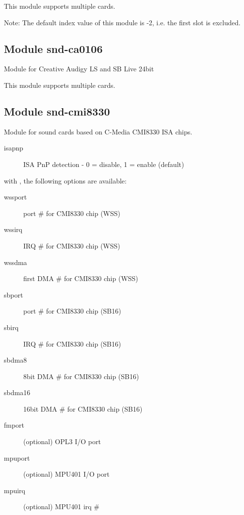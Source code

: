 \documentclass[a4paper,8pt,english]{sphinxmanual}
\begin{document}
This module supports multiple cards.

Note: The default index value of this module is -2, i.e. the first
slot is excluded.


\subsection{Module snd-ca0106}
\label{sound/alsa-configuration:module-snd-ca0106}
Module for Creative Audigy LS and SB Live 24bit

This module supports multiple cards.


\subsection{Module snd-cmi8330}
\label{sound/alsa-configuration:module-snd-cmi8330}
Module for sound cards based on C-Media CMI8330 ISA chips.
\begin{description}
\item[{isapnp}] \leavevmode
ISA PnP detection - 0 = disable, 1 = enable (default)

\end{description}

with , the following options are available:
\begin{description}
\item[{wssport}] \leavevmode
port \# for CMI8330 chip (WSS)

\item[{wssirq}] \leavevmode
IRQ \# for CMI8330 chip (WSS)

\item[{wssdma}] \leavevmode
first DMA \# for CMI8330 chip (WSS)

\item[{sbport}] \leavevmode
port \# for CMI8330 chip (SB16)

\item[{sbirq}] \leavevmode
IRQ \# for CMI8330 chip (SB16)

\item[{sbdma8}] \leavevmode
8bit DMA \# for CMI8330 chip (SB16)

\item[{sbdma16}] \leavevmode
16bit DMA \# for CMI8330 chip (SB16)

\item[{fmport}] \leavevmode
(optional) OPL3 I/O port

\item[{mpuport}] \leavevmode
(optional) MPU401 I/O port

\item[{mpuirq}] \leavevmode
(optional) MPU401 irq \#

\end{description}
\end{document}
